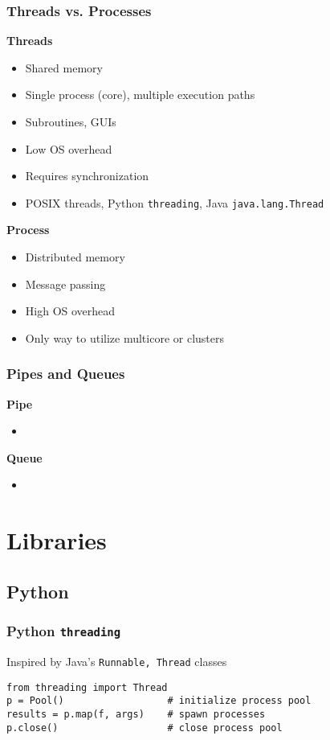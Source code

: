 \documentclass{beamer}
\begin{document}
\begin{frame}
\frametitle{Threads vs. Processes}
\textbf{Threads}
\begin{itemize}
  \item Shared memory
  \item Single process (core), multiple execution paths
  \item Subroutines, GUIs
  \item Low OS overhead
  \item Requires synchronization
  \item POSIX threads, Python \texttt{threading}, Java \texttt{java.lang.Thread}
\end{itemize}

\textbf{Process}
\begin{itemize}
  \item Distributed memory
  \item Message passing
  \item High OS overhead
  \item Only way to utilize multicore or clusters
\end{itemize}

\end{frame}

\begin{frame}
\frametitle{Pipes and Queues}
\textbf{Pipe}
\begin{itemize}
  \item 
\end{itemize}

\textbf{Queue}
\begin{itemize}
  \item  
\end{itemize}
\end{frame}



\section{Libraries}
\subsection{Python}
\begin{frame}[fragile]
\frametitle{Python \texttt{threading}}
Inspired by Java's \texttt{Runnable, Thread} classes
\begin{verbatim}
from threading import Thread
p = Pool()                  # initialize process pool
results = p.map(f, args)    # spawn processes
p.close()                   # close process pool 
\end{verbatim}
\end{frame}
\end{document}
